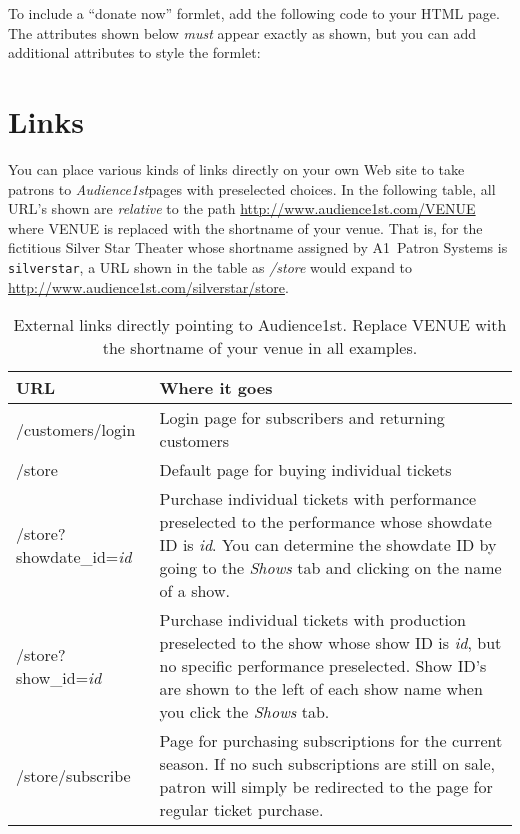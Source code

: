 \documentclass{article}
\newcommand{\af}{{\em Audience1st}}
\begin{document}
To include a ``donate now'' formlet, add the following code to your HTML
page.  The attributes shown below \emph{must} appear exactly as shown,
but you can add additional attributes to style the formlet:


\section{Links}
\label{sec:linking}

You can place various kinds of links directly on your own Web site to
take patrons to \af pages with preselected choices.  In the following
table, all URL's shown are \emph{relative} to the path
\url{http://www.audience1st.com/VENUE} where VENUE is replaced with the
shortname of your venue.  That is, for the fictitious Silver Star
Theater  whose shortname 
assigned by A1~Patron Systems is \verb+silverstar+, 
a URL shown in the table as
\emph{/store} would expand to
\url{http://www.audience1st.com/silverstar/store}.

\begin{table}
  \begin{tabular}{|l|p{}}
    \hline
    \textbf{URL} & \textbf{Where it goes} \\
    \hline
    /customers/login  & Login page for subscribers and returning
    customers \\
    /store & Default page for buying individual tickets \\
    /store?showdate\_id=\emph{id} & Purchase individual tickets with
    performance preselected to the performance whose showdate ID is \emph{id}.
    You can determine the showdate ID by going to the \emph{Shows} tab
    and clicking on the name of a show. \\
    /store?show\_id=\emph{id} & Purchase individual tickets with
    production preselected to the show whose show ID is \emph{id}, but
    no specific performance preselected.  Show
    ID's are shown to the left of each show name when you click the
    \emph{Shows} tab. \\
    /store/subscribe & Page for purchasing subscriptions for the current
    season.  If no such subscriptions are still on sale, patron will
    simply be redirected to the page for regular ticket purchase. \\
  \end{tabular}
\label{table:links}
\caption{External links directly pointing to Audience1st.  Replace
  VENUE with the shortname of your venue in all examples.}
\end{table}
\end{document}
